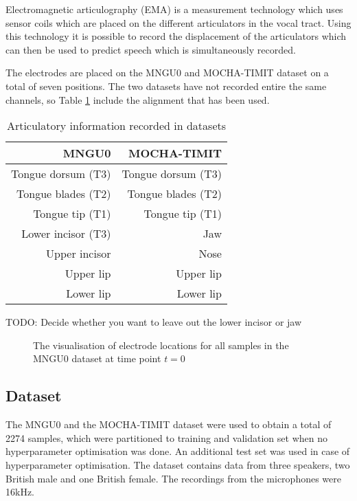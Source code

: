 \documentclass[a4paper]{article}
\begin{document}
Electromagnetic articulography (EMA) is a measurement technology which uses
sensor coils which are placed on the different articulators in the vocal tract.
Using this technology it is possible to record the displacement of the articulators
which can then be used to predict speech which is simultaneously recorded.

The electrodes are placed on the MNGU0 \cite{Richmond2011} and MOCHA-TIMIT dataset on a total
of seven positions. The two datasets have not recorded entire the
same channels, so Table \ref{tab:electrodes} include the alignment
that has been used.
\begin{table}[th]
  \label{tab:electrodes}
  \caption{Articulatory information recorded in datasets}
  \centering
  \begin{tabular}{ r r }
    \toprule
    \textbf{MNGU0} & \textbf{MOCHA-TIMIT} \\
    \midrule
    Tongue dorsum (T3) & Tongue dorsum (T3) \\
    Tongue blades (T2) & Tongue blades (T2) \\
    Tongue tip (T1) & Tongue tip (T1) \\
    Lower incisor (T3) & Jaw \\
    Upper incisor & Nose \\
    Upper lip & Upper lip \\
    Lower lip & Lower lip \\
    \bottomrule
    \end{tabular}
\end{table}

TODO: Decide whether you want to leave out the lower incisor or jaw

\begin{figure}[t]
  \begin{center}
    \scalebox{0.50}{}
  \caption{The visualisation of electrode locations for all samples in
    the MNGU0 dataset at time point \( t = 0 \)}
\end{center}
\end{figure}
\subsection{Dataset}

The MNGU0 and the MOCHA-TIMIT dataset were used to obtain a total of
2274 samples, which were partitioned to training and validation set when
no hyperparameter optimisation was done. An additional test set was used
in case of hyperparameter optimisation. The dataset contains data from
three speakers, two British male and one British female. The recordings
from the microphones were 16kHz.
\end{document}
